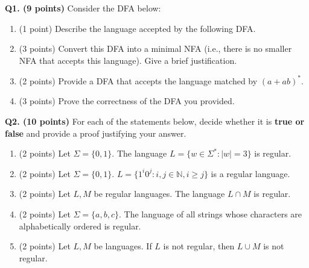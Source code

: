 \documentclass{article}
\begin{document}
    \noindent\textbf{Q1. (9 points)} Consider the DFA below:
    \begin{center}
    \end{center}
    \begin{enumerate}[label=\alph*)]
        \item (1 point) Describe the language accepted by the following DFA.

        \item (3 points) Convert this DFA into a minimal NFA (i.e., there is no smaller NFA that accepts this language). Give a brief justification.
        
        \pagebreak

        \item  (2 points) Provide a DFA that accepts the language matched by \((a+ab)^*\).
        \vfill
        \item (3 points) Prove the correctness of the DFA you provided.
    \end{enumerate}

    \pagebreak

    \noindent\textbf{Q2. (10 points)} For each of the statements below, decide whether it is \textbf{true or false} and provide a proof justifying your answer.

    \begin{enumerate}[label=\alph*)]
        \item (2 points) Let \(\Sigma = \{0, 1\}\). The language \(L = \{w \in \Sigma ^* : |w| = 3\}\) is regular.
        \vfill
        \item (2 points) Let \(\Sigma = \{0, 1\}\). \(L = \{1^{i}0^j : i,j \in \mathbb{N}, i \geq j\}\) is a regular language.
        \vfill
        \item (2 points) Let \(L, M\) be regular languages. The language \(L \cap M\) is regular.
        \vfill
        \pagebreak
        \item (2 points) Let \(\Sigma = \{a, b, c\}\). The language of all strings whose characters are alphabetically ordered is regular.
        \vfill
        \item (2 points) Let \(L, M\) be languages. If \(L\) is not regular, then \(L \cup M\) is not regular.
        \vfill
    \end{enumerate}
\end{document}
